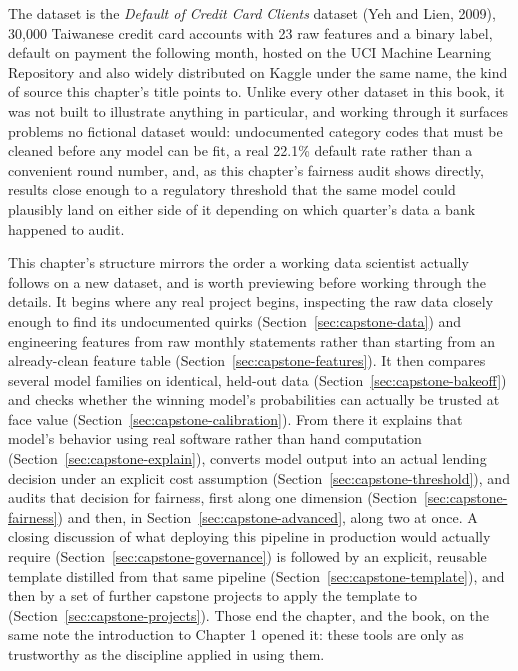 \documentclass[../ai_in_finance]{subfiles}
\begin{document}
The dataset is the \emph{Default of Credit Card Clients} dataset (Yeh and Lien, 2009), 30,000 Taiwanese credit card accounts with 23 raw features and a binary label, default on payment the following month, hosted on the UCI Machine Learning Repository and also widely distributed on Kaggle under the same name, the kind of source this chapter's title points to. Unlike every other dataset in this book, it was not built to illustrate anything in particular, and working through it surfaces problems no fictional dataset would: undocumented category codes that must be cleaned before any model can be fit, a real 22.1\% default rate rather than a convenient round number, and, as this chapter's fairness audit shows directly, results close enough to a regulatory threshold that the same model could plausibly land on either side of it depending on which quarter's data a bank happened to audit.

This chapter's structure mirrors the order a working data scientist actually follows on a new dataset, and is worth previewing before working through the details. It begins where any real project begins, inspecting the raw data closely enough to find its undocumented quirks (Section~\ref{sec:capstone-data}) and engineering features from raw monthly statements rather than starting from an already-clean feature table (Section~\ref{sec:capstone-features}). It then compares several model families on identical, held-out data (Section~\ref{sec:capstone-bakeoff}) and checks whether the winning model's probabilities can actually be trusted at face value (Section~\ref{sec:capstone-calibration}). From there it explains that model's behavior using real software rather than hand computation (Section~\ref{sec:capstone-explain}), converts model output into an actual lending decision under an explicit cost assumption (Section~\ref{sec:capstone-threshold}), and audits that decision for fairness, first along one dimension (Section~\ref{sec:capstone-fairness}) and then, in Section~\ref{sec:capstone-advanced}, along two at once. A closing discussion of what deploying this pipeline in production would actually require (Section~\ref{sec:capstone-governance}) is followed by an explicit, reusable template distilled from that same pipeline (Section~\ref{sec:capstone-template}), and then by a set of further capstone projects to apply the template to (Section~\ref{sec:capstone-projects}). Those end the chapter, and the book, on the same note the introduction to Chapter 1 opened it: these tools are only as trustworthy as the discipline applied in using them.
\end{document}
